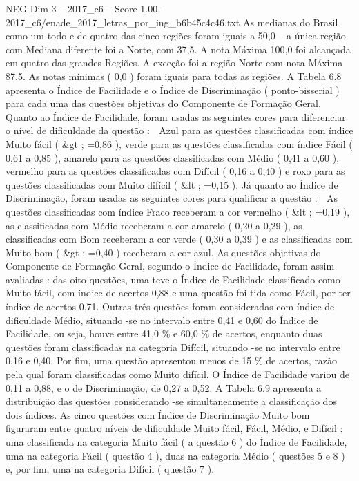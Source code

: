 \begin{textsample}{NEG Dim 3 – 2017\_c6 – Score 1.00 – 2017\_c6/enade\_2017\_letras\_por\_ing\_b6b45c4c46.txt}
As medianas do Brasil como um todo e de quatro das cinco regiões foram iguais a 50,0 – a única região com Mediana diferente foi a Norte, com 37,5.
A nota Máxima 100,0 foi alcançada em quatro das grandes Regiões.
A exceção foi a região Norte com nota Máxima 87,5.
As notas mínimas ( 0,0 ) foram iguais para todas as regiões.
A Tabela 6.8 apresenta o Índice de Facilidade e o Índice de Discriminação ( ponto-bisserial ) para cada uma das questões objetivas do Componente de Formação Geral.
Quanto ao Índice de Facilidade, foram usadas as seguintes cores para diferenciar o nível de dificuldade da questão :  Azul para as questões classificadas com índice Muito fácil ( \&gt ; =0,86 ), verde para as questões classificadas com índice Fácil ( 0,61 a 0,85 ), amarelo para as questões classificadas com Médio ( 0,41 a 0,60 ), vermelho para as questões classificadas com Difícil ( 0,16 a 0,40 ) e roxo para as questões classificadas com Muito difícil ( \&lt ; =0,15 ).
Já quanto ao Índice de Discriminação, foram usadas as seguintes cores para qualificar a questão :  As questões classificadas com índice Fraco receberam a cor vermelho ( \&lt ; =0,19 ), as classificadas com Médio receberam a cor amarelo ( 0,20 a 0,29 ), as classificadas com Bom receberam a cor verde ( 0,30 a 0,39 ) e as classificadas com Muito bom ( \&gt ; =0,40 ) receberam a cor azul.
As questões objetivas do Componente de Formação Geral, segundo o Índice de Facilidade, foram assim avaliadas : das oito questões, uma teve o Índice de Facilidade classificado como Muito fácil, com índice de acertos 0,88 e uma questão foi tida como Fácil, por ter índice de acertos 0,71.
Outras três questões foram consideradas com índice de dificuldade Médio, situando -se no intervalo entre 0,41 e 0,60 do Índice de Facilidade, ou seja, houve entre 41,0 \% e 60,0 \% de acertos, enquanto duas questões foram classificadas na categoria Difícil, situando -se no intervalo entre 0,16 e 0,40.
Por fim, uma questão apresentou menos de 15 \% de acertos, razão pela qual foram classificadas como Muito difícil.
O Índice de Facilidade variou de 0,11 a 0,88, e o de Discriminação, de 0,27 a 0,52.
A Tabela 6.9 apresenta a distribuição das questões considerando -se simultaneamente a classificação dos dois índices.
As cinco questões com Índice de Discriminação Muito bom figuraram entre quatro níveis de dificuldade Muito fácil, Fácil, Médio, e Difícil : uma classificada na categoria Muito fácil ( a questão 6 ) do Índice de Facilidade, uma na categoria Fácil ( questão 4 ), duas na categoria Médio ( questões 5 e 8 ) e, por fim, uma na categoria Difícil ( questão 7 ).

\end{textsample}
